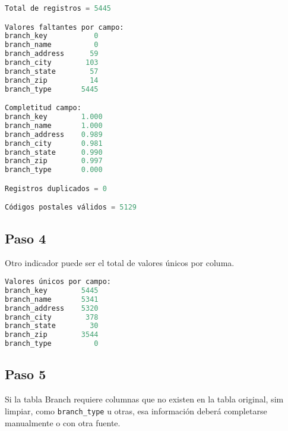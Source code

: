\begin{lstlisting}[language = Python, caption = {Estadísticas}]
Total de registros = 5445

Valores faltantes por campo:
branch_key           0
branch_name          0
branch_address      59
branch_city        103
branch_state        57
branch_zip          14
branch_type       5445

Completitud campo:
branch_key        1.000
branch_name       1.000
branch_address    0.989
branch_city       0.981
branch_state      0.990
branch_zip        0.997
branch_type       0.000

Registros duplicados = 0

Códigos postales válidos = 5129
\end{lstlisting}

\vspace{2.5 cm}

\subsection*{Paso 4}

Otro indicador puede ser el total de valores únicos por columa.

\vspace{0.5 cm}



\vspace{0.5 cm}

\begin{lstlisting}[language = Python, caption = {Valores únicos por campo.}]
Valores únicos por campo:
branch_key        5445
branch_name       5341
branch_address    5320
branch_city        378
branch_state        30
branch_zip        3544
branch_type          0
\end{lstlisting}

\vspace{0.5 cm}

\subsection*{Paso 5}

Si la tabla Branch requiere columnas que no existen en la tabla original, 
sim limpiar, como \texttt{branch\_type} u otras, esa información deberá 
completarse manualmente o con otra fuente.